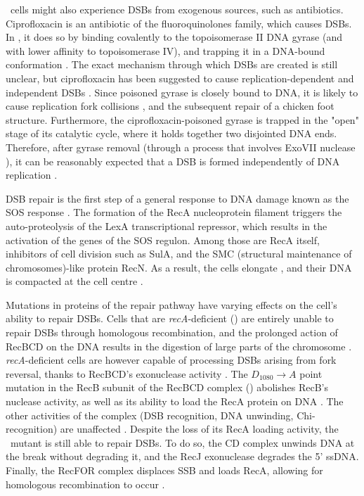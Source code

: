 \ecoli\ cells might also experience DSBs from exo\-genous sources, such as anti\-biotics. Ciprofloxacin is an antibiotic of the fluoro\-quinolones family, which causes DSBs. In \ecoli, it does so by binding covalently to the topoisomerase II DNA gyrase (and with lower affinity to topoisomerase IV), and trapping it in a DNA-bound conformation \cite{Kohanski2010}. The exact mechanism through which DSBs are created is still unclear, but ciprofloxacin has been suggested to cause replication-dependent and independent DSBs \cite{Ojkic2020}. Since poisoned gyrase is closely bound to DNA, it is likely to cause replication fork collisions \cite{Wentzell2000, Drlica2008}, and the subsequent repair of a chicken foot structure. Furthermore, the ciprofloxacin-poisoned gyrase is trapped in the "open" stage of its catalytic cycle, where it holds together two disjointed DNA ends. Therefore, after gyrase removal (through a process that involves ExoVII nuclease \cite{Huang2021}), it can be reasonably expected that a DSB is formed independently of DNA replication \cite{Zhao2006}.

DSB repair is the first step of a general response to DNA damage known as the SOS response \cite{Baharoglu2014}. The formation of the RecA nucleoprotein filament triggers the auto-proteolysis of the LexA transcriptional repressor, which results in the activation of the genes of the SOS regulon. Among those are RecA itself, inhibitors of cell division such as SulA, and the SMC (structural maintenance of chromosomes)-like protein RecN. As a result, the cells elongate \cite{Bos2015}, and their DNA is compacted at the cell centre \cite{Odsbu2014}.

Mutations in proteins of the repair pathway have varying effects on the cell's ability to repair DSBs. Cells that are \emph{recA}-deficient (\dreca) are entirely unable to repair DSBs through homologous recombination, and the prolonged action of RecBCD on the DNA results in the digestion of large parts of the chromosome \cite{Horii1968, Chow2007}. \emph{recA}-deficient cells are however capable of processing DSBs arising from fork reversal, thanks to RecBCD's exonuclease activity \cite{Seigneur1998, Michel2001}. The $D_{1080} \rightarrow A$ point mutation in the RecB subunit of the RecBCD complex (\teneighty) abolishes RecB's nuclease activity, as well as its ability to load the RecA protein on DNA \cite{Yu1998, Wang2000}. The other activities of the complex (DSB recognition, DNA unwinding, Chi-recognition) are unaffected \cite{Anderson1999}. Despite the loss of its RecA loading activity, the \geneteneighty\ mutant is still able to repair DSBs. To do so, the \teneighty CD complex unwinds DNA at the break without degrading it, and the RecJ exonuclease degrades the 5' ssDNA. Finally, the RecFOR complex displaces SSB and loads RecA, allowing for homologous recombination to occur \cite{Ivancic-Bace_2003}.

